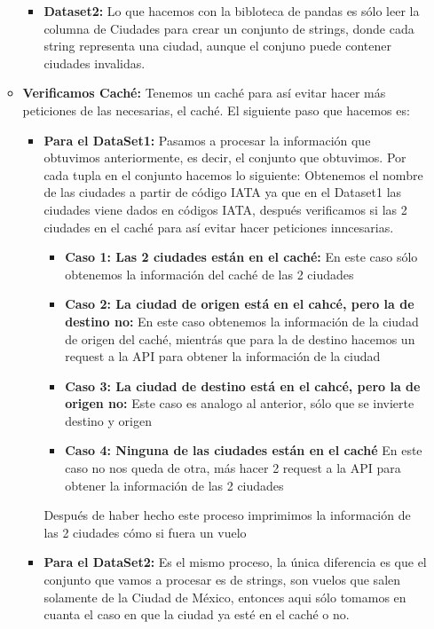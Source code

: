 \documentclass{article}
\begin{document}
\begin{itemize}
\begin{itemize}
\begin{itemize}
                    \item \textbf{Dataset2: } Lo que hacemos con la bibloteca de pandas es sólo leer la columna de Ciudades para crear un conjunto de strings, donde cada string representa una ciudad, aunque el conjuno puede contener ciudades invalidas.
                \end{itemize}
                \item \textbf{Verificamos Caché: } Tenemos un caché para así evitar hacer más peticiones de las necesarias, el caché.
                El siguiente paso que hacemos es:
                \begin{itemize}
                    \item \textbf{Para el DataSet1: } Pasamos a procesar la información que obtuvimos anteriormente, es decir, el conjunto que obtuvimos.
                    Por cada tupla en el conjunto hacemos lo siguiente: Obtenemos el nombre de las ciudades a partir de código IATA ya que en el Dataset1 las ciudades viene dados en códigos IATA, después verificamos si las 2 ciudades en el caché para así evitar hacer peticiones inncesarias.
                    \begin{itemize}
                        \item \textbf{Caso 1: Las 2 ciudades están en el caché: } En este caso sólo obtenemos la información del caché de las 2 ciudades
                        \item \textbf{Caso 2: La ciudad de origen está en el cahcé, pero la de destino no: } En este caso obtenemos la información de la ciudad de origen del caché, mientrás que para la de destino hacemos un request a la API para obtener la información de la ciudad
                        \item \textbf{Caso 3: La ciudad de destino está en el cahcé, pero la de origen no: } Este caso es analogo al anterior, sólo que se invierte destino y origen
                        \item \textbf{Caso 4: Ninguna de las ciudades están en el caché } En este caso no nos queda de otra, más hacer 2 request a la API para obtener la información de las 2 ciudades
                    \end{itemize}
                    Después de haber hecho este proceso imprimimos la información de las 2 ciudades cómo si fuera un vuelo
                    \item \textbf{Para el DataSet2: } Es el mismo proceso, la única diferencia es que el conjunto que vamos a procesar es de strings, son vuelos que salen solamente de la Ciudad de México, entonces aqui sólo tomamos en cuanta el caso en que la ciudad ya esté en el caché o no.

\end{itemize}
\end{itemize}
\end{itemize}
\end{document}
